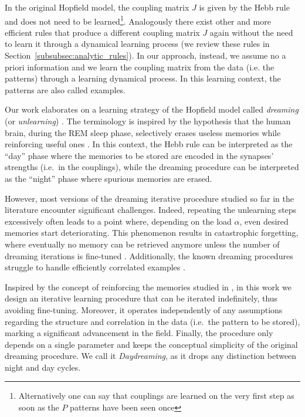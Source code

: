 \documentclass[a4paper]{cas-sc}
\begin{document}
In the original Hopfield model, the coupling matrix $J$ is given by the Hebb rule and does not need to be learned\footnote{Alternatively one can say that couplings are learned on the very first step as soon as the $P$ patterns have been seen once}. Analogously there exist other and more efficient rules that produce a different coupling matrix $J$ again without the need to learn it through a dynamical learning process (we review these rules in Section~\ref{subsubsec:analytic_rules}). In our approach, instead, we assume no a priori information and we learn the coupling matrix from the data (i.e. the patterns) through a learning dynamical process. In this learning context, the patterns are also called examples.

Our work elaborates on a learning strategy of the Hopfield model called \emph{dreaming} (or \emph{unlearning}) \cite{Hopfield1983}. The terminology is inspired by the hypothesis that the human brain, during the REM sleep phase, selectively erases useless memories while reinforcing useful ones \cite{crick1983function}. In this context, the Hebb rule can be interpreted as the ``day'' phase where the memories to be stored are encoded in the synapses' strengths (i.e.\ in the couplings), while the dreaming procedure can be interpreted as the ``night'' phase where spurious memories are erased.

However, most versions of the dreaming iterative procedure studied so far in the literature encounter significant challenges. Indeed, repeating the unlearning steps excessively often leads to a point where, depending on the load $\alpha$, even desired memories start deteriorating. This phenomenon results in catastrophic forgetting, where eventually no memory can be retrieved anymore unless the number of dreaming iterations is fine-tuned \cite{van1990increasing, van1992unlearning}. Additionally, the known dreaming procedures struggle to handle efficiently correlated examples \cite{van1997hebbian}.

Inspired by the concept of reinforcing the memories studied in \cite{fachechi2019dreaming}, in this work we design an iterative learning procedure that can be iterated indefinitely, thus avoiding fine-tuning. Moreover, it operates independently of any assumptions regarding the structure and correlation in the data (i.e.\ the pattern to be stored), marking a significant advancement in the field. Finally, the procedure only depends on a single parameter and keeps the conceptual simplicity of the original dreaming procedure. We call it \emph{Daydreaming}, as it drops any distinction between night and day cycles.
\end{document}
